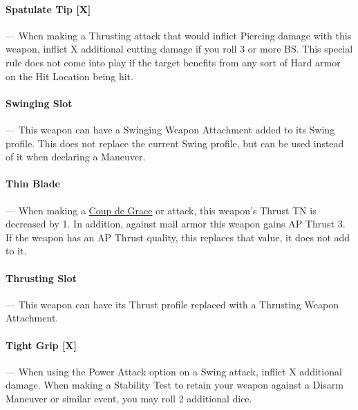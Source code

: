 \documentclass[oneside,11pt,english]{book}
\begin{document}
\vspace{-5pt}\paragraph[Spatulate Tip]{\label{wepqual:Spatulate Tip}Spatulate Tip [X]}---\quad
When making a Thrusting attack that would inflict Piercing damage with this
weapon, inflict X additional cutting damage if you roll 3 or more BS. This
special rule does not come into play if the target benefits from any sort of
Hard armor on the Hit Location being hit. 

\vspace{-5pt}\paragraph{\label{wepqual:Swinging Slot}Swinging Slot}---\quad
This weapon can have a Swinging Weapon Attachment added to its Swing profile. This does not replace the current Swing profile, but can be used instead of it when declaring a Maneuver.

\vspace{-5pt}\paragraph{\label{wepqual:Thin Blade}Thin Blade}---\quad
When making a \hyperref[man:grappling-coup-de-grace]{Coup de Grace} or  attack, this weapon’s Thrust TN is decreased by 1. In addition, against mail armor this weapon gains AP Thrust 3. If the weapon has an AP Thrust quality, this replaces that value, it does not add to it.

\vspace{-5pt}\paragraph{\label{wepqual:Thrusting Slot}Thrusting Slot}---\quad
This weapon can have its Thrust profile replaced with a Thrusting Weapon Attachment.

\vspace{-5pt}\paragraph[Tight Grip]{\label{wepqual:Tight Grip}Tight Grip [X]}---\quad
When using the Power Attack option on a Swing attack, inflict X additional
damage. When making a Stability Test to retain your weapon against a Disarm
Maneuver or similar event, you may roll 2 additional dice. 
\end{document}

